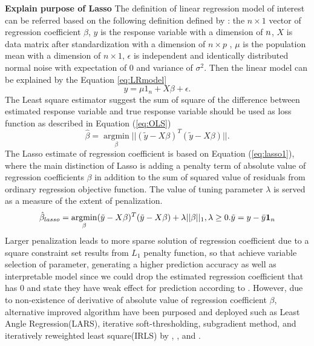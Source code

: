 \textbf{Explain purpose of Lasso}
The definition of linear regression model of interest can be referred based on the following definition defined by \cite{tibshirani_1996}: the $n \times 1$ vector of regression coefficient $\beta$,  $y$ is the response variable with a dimension of $n \time 1$, $X$ is data matrix after standardization with a dimension of $n \times p$ , $\mu$ is the population mean with a dimension of $n \times 1$, $\epsilon$ is independent and identically distributed normal noise with expectation of 0 and variance of $\sigma^2$. Then the linear model can be explained by the Equation \ref{eq:LRmodel}
\begin{equation}
	\label{eq:LRmodel}
	y = \mu 1_n + X\beta + \epsilon.
\end{equation} 
The Least square estimator suggest the sum of square of the difference between estimated response variable and true response variable should be used as loss function as described in Equation (\ref{eq:OLS})
\begin{equation}
	\label{eq:OLS}
	\hat{\beta} = \underset{\beta}{\operatorname{argmin}} || (\tilde{y} - X\beta)^T(\tilde{y}-X\beta)||.
\end{equation}
 The Lasso estimate of regression coefficient is based on Equation (\ref{eq:lasso1}), where the main distinction of Lasso is adding a penalty term of absolute value of regression coefficients $\beta$ in addition to the sum of squared value of residuals from ordinary regression objective function. The value of tuning parameter $\lambda$ is served as a measure of the extent of penalization.
 \begin{equation}
 	\label{eq:lasso1}
 	\hat{\beta}_{lasso} = \underset{\beta}{\operatorname{argmin}} (\tilde{y}-X\beta)^T(\tilde{y}-X\beta) + \lambda ||\beta||_1, \lambda \geq 0. \tilde{y} =  y - \bar{y}\textbf{1}_n \\
 \end{equation}
 Larger penalization leads to more sparse solution of regression coefficient due to a square constraint set results from $L_1$ penalty function, so that achieve variable selection of parameter, generating a higher prediction accuracy as well as interpretable model since we could drop the estimated regression coefficient that has 0 and state they have weak effect for prediction according to \cite{tibshirani_1996}.
However, due to non-existence of derivative of absolute value of regression coefficient $\beta$, alternative improved algorithm have been purposed and deployed such as Least Angle Regression(LARS), iterative soft-thresholding, subgradient method, and iteratively reweighted least square(IRLS) by \cite{efron_hastie_johnstone_tibshirani_2004},   \cite{beck_teboulle_2009}, \cite{nan_zhang_shuqing_zeng_2005} and \cite{friedman_hastie_tibshirani_2010}.

